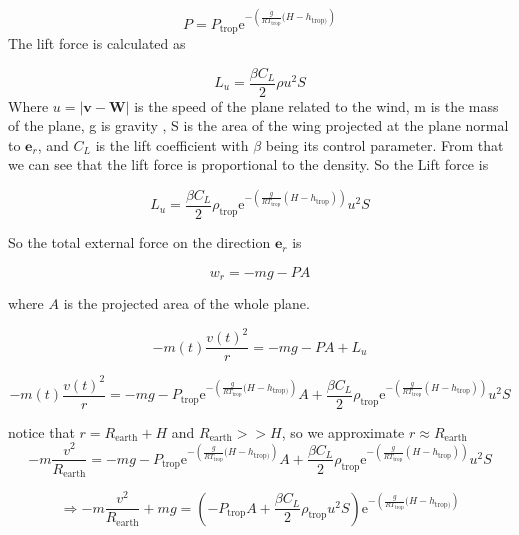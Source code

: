 \documentclass{article}
\renewcommand{\vec}[1]{\boldsymbol{#1}}
\begin{document}
\begin{equation}
    P= P_{\text{trop}}\mathrm{e}^{-\left( \frac{g}{RT_{\text{trop}}}(H-h_{\text{trop})} \right)}
\end{equation}
The lift force is calculated as

\begin{equation}
    L_u= \frac{\beta C_L}{2} \rho u^2S
\end{equation}
Where $u=|\vec{v}-\vec{W}|$ is the speed of the plane related to the wind, m is the mass of the plane, g is gravity , S is the area of the wing  projected at the plane normal to $\vec{e}_r$, and $C_L$ is the lift coefficient with $\beta$ being its control parameter. From that we can see that the lift force is proportional to the density.  So the Lift force is 

\begin{equation}
    L_u= \frac{\beta C_L}{2} \rho_{\text{trop}}\mathrm{e}^{-\left( \frac{g}{RT_{\text{trop}}}(H-h_{\text{trop}}) \right)} u^2S
\end{equation}

So the total external force on the direction $\vec{e}_r$ is 

\begin{equation}
    w_r=-mg -PA 
\end{equation}

where $A$ is the projected area of the whole plane.

\begin{equation}
    -m(t)\frac{v(t)^2}{r}=-mg- PA +L_u
\end{equation}

\begin{equation}
     -m(t)\frac{v(t)^2}{r}=-mg-  P_{\text{trop}}\mathrm{e}^{-\left( \frac{g}{RT_{\text{trop}}}(H-h_{\text{trop})} \right)}A +\frac{\beta C_L}{2} \rho_{\text{trop}}\mathrm{e}^{-\left( \frac{g}{RT_{\text{trop}}}(H-h_{\text{trop}}) \right)} u^2S
   \end{equation}

notice that $r=R_{\text{earth}}+H$ and $R_{\text{earth}}>> H$, so we approximate $r\approx R_{\text{earth}}$
\begin{equation}
    -m\frac{v^2}{R_{\text{earth}}}= -mg-  P_{\text{trop}}\mathrm{e}^{-\left( \frac{g}{RT_{\text{trop}}}(H-h_{\text{trop})} \right)}A +\frac{\beta C_L}{2} \rho_{\text{trop}}\mathrm{e}^{-\left( \frac{g}{RT_{\text{trop}}}(H-h_{\text{trop}}) \right)} u^2S
\end{equation}

\begin{equation}
\Rightarrow     -m\frac{v^2}{R_{\text{earth}}} +mg= \left(-  P_{\text{trop}}A +\frac{\beta C_L}{2} \rho_{\text{trop}} u^2S\right) \mathrm{e}^{-\left( \frac{g}{RT_{\text{trop}}}(H-h_{\text{trop})} \right)}
\end{equation}
\end{document}
